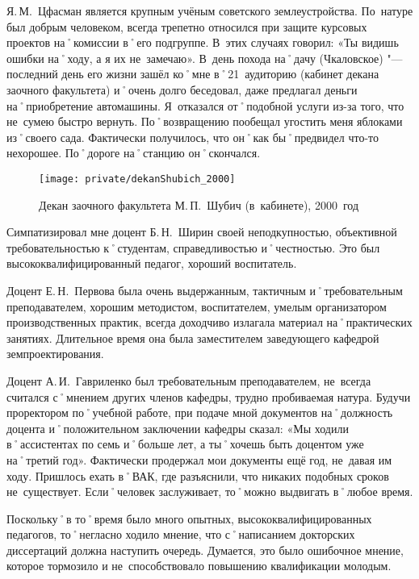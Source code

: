 Я.\,М.~Цфасман является крупным учёным советского землеустройства. По~натуре был добрым человеком, всегда трепетно относился при защите курсовых проектов на˚комиссии в˚его подгруппе. В~этих случаях говорил: «Ты видишь ошибки на˚ходу, а я их не~замечаю». В~день похода на˚дачу (Чкаловское) "--- последний день его жизни зашёл ко˚мне в˚21~аудиторию (кабинет декана заочного факультета) и˚очень долго беседовал, даже предлагал деньги на˚приобретение автомашины. Я~отказался от˚подобной услуги из-за того, что не~сумею быстро вернуть. По˚возвращению пообещал угостить меня яблоками из˚своего сада. Фактически получилось, что он˚как бы˚предвидел что-то нехорошее. По˚дороге на˚станцию он˚скончался.

\begin{figure}[h]
\texttt{[image: private/dekanShubich\_2000]}
\caption{Декан заочного факультета М.\,П.~Шубич (в~кабинете), 2000~год}
\label{fig:dekanShubich_2000}
\end{figure}

Симпатизировал мне доцент Б.\,Н.~Ширин своей неподкупностью, объективной требовательностью к˚студентам, справедливостью и˚честностью. Это был высококвалифицированный педагог, хороший воспитатель.

Доцент Е.\,Н.~Первова была очень выдержанным, тактичным и˚требовательным преподавателем, хорошим методистом, воспитателем, умелым организатором производственных практик, всегда доходчиво излагала материал на˚практических занятиях. Длительное время она была заместителем заведующего кафедрой земпроектирования.

Доцент А.\,И.~Гавриленко был требовательным преподавателем, не~всегда считался с˚мнением других членов кафедры, трудно пробиваемая натура. Будучи проректором по˚учебной работе, при подаче мной документов на˚должность доцента и˚положительном заключении кафедры сказал: «Мы ходили в˚ассистентах по семь и˚больше лет, а ты˚хочешь быть доцентом уже на˚третий год». Фактически продержал мои документы ещё год, не~давая им ходу. Пришлось ехать в˚ВАК, где разъяснили, что никаких подобных сроков не~существует. Если˚человек заслуживает, то˚можно выдвигать в˚любое время.

Поскольку˚в то˚время было много опытных, высококвалифицированных педагогов, то˚негласно ходило мнение, что с˚написанием докторских диссертаций должна наступить очередь. Думается, это было ошибочное мнение, которое тормозило и не~способствовало повышению квалификации молодым.

